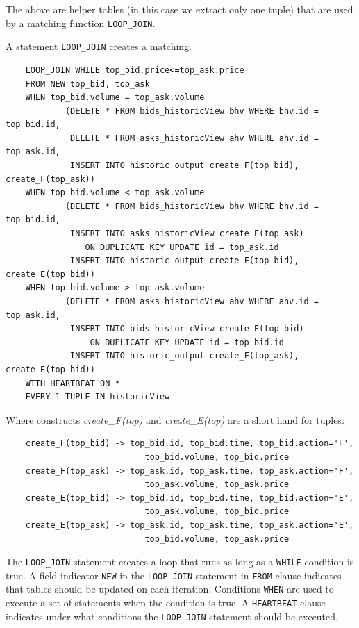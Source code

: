 \documentclass{article}
\begin{document}
The above are helper tables (in this case we extract only one tuple) that are used by a matching function {\tt LOOP\_JOIN}.

A statement {\tt LOOP\_JOIN} creates a matching. 

\begin{verbatim}  
    LOOP_JOIN WHILE top_bid.price<=top_ask.price
    FROM NEW top_bid, top_ask
    WHEN top_bid.volume = top_ask.volume 
            (DELETE * FROM bids_historicView bhv WHERE bhv.id = top_bid.id,
             DELETE * FROM asks_historicView ahv WHERE ahv.id = top_ask.id,
             INSERT INTO historic_output create_F(top_bid), create_F(top_ask))
    WHEN top_bid.volume < top_ask.volume 
            (DELETE * FROM bids_historicView bhv WHERE bhv.id = top_bid.id,
             INSERT INTO asks_historicView create_E(top_ask) 
                ON DUPLICATE KEY UPDATE id = top_ask.id
             INSERT INTO historic_output create_F(top_bid), create_E(top_bid))
    WHEN top_bid.volume > top_ask.volume 
            (DELETE * FROM asks_historicView ahv WHERE ahv.id = top_ask.id,
             INSERT INTO bids_historicView create_E(top_bid) 
                 ON DUPLICATE KEY UPDATE id = top_bid.id
             INSERT INTO historic_output create_F(top_ask), create_E(top_bid))
    WITH HEARTBEAT ON *
    EVERY 1 TUPLE IN historicView
\end{verbatim}

\noindent Where constructs \emph{create\_F(top)} and \emph{create\_E(top)} are a short hand for tuples:

\begin{verbatim}
    create_F(top_bid) -> top_bid.id, top_bid.time, top_bid.action='F',
                            top_bid.volume, top_bid.price
    create_F(top_ask) -> top_ask.id, top_ask.time, top_ask.action='F',
                            top_ask.volume, top_ask.price
    create_E(top_bid) -> top_bid.id, top_bid.time, top_bid.action='E',
                            top_ask.volume, top_bid.price
    create_E(top_ask) -> top_ask.id, top_ask.time, top_ask.action='E',
                            top_bid.volume, top_ask.price
\end{verbatim}

The {\tt LOOP\_JOIN} statement creates a loop that runs as long as a {\tt WHILE} condition is true. A field indicator {\tt NEW} in the {\tt LOOP\_JOIN} statement in {\tt FROM} clause indicates that tables should be updated on each iteration. Conditions {\tt WHEN} are used to execute a set of statements when the condition is true. A {\tt HEARTBEAT} clause indicates under what conditions the {\tt LOOP\_JOIN} statement should be executed. 
\end{document}
